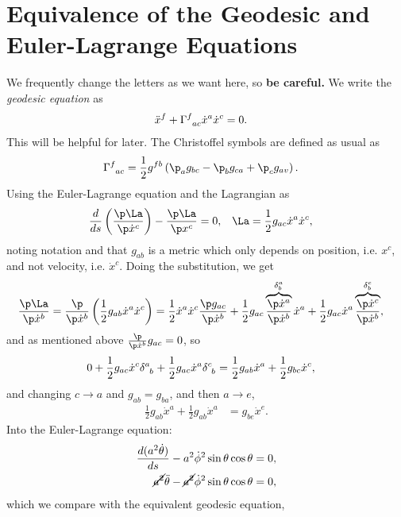 \documentclass[a4paper, 11pt, normalem]{report}
\begin{document}
\section{Equivalence of the Geodesic and Euler-Lagrange Equations}
We frequently change the letters as we want here, so \textbf{be careful.}
We write the \emph{geodesic equation} as
\begin{align}
    \ddot{x}^f + \tensor{\Gamma}{^f_{ac}}\dot{x}^a\dot{x}^c &= 0.
\end{align}
This will be helpful for later. 
The Christoffel symbols are defined as usual as
\begin{align}
    \tensor{\Gamma}{^f_{ac}} &= \frac12g^{fb}\left(\p_ag_{bc}-\p_bg_{ca}+\p_cg_{av}\right). 
\end{align}
Using the Euler-Lagrange equation and the Lagrangian as
\begin{align}
    \frac{d}{ds}\left(\frac{\p\La}{\p\dot{x}^c}\right) - \frac{\p\La}{\p x^c} &= 0, & \La &= \frac12g_{ac}\dot{x}^a\dot{x}^c,
\end{align}
noting notation and that $g_{ab}$ is a metric which only depends on position, i.e. $x^c$, and not velocity, i.e. $\dot{x}^c$.
Doing the substitution, we get
\begin{align}
    \frac{\p\La}{\p\dot{x}^b} &= \frac{\p}{\p\dot{x}^b}\left(\frac12g_{ab}\dot{x}^a\dot{x}^c\right) = \frac12\dot{x}^a\dot{x}^c\frac{\p g_{ac}}{\p\dot{x}^b} + \frac12g_{ac}\overbrace{\frac{\p\dot{x}^a}{\p\dot{x}^b}}^{\delta^a_b}\dot{x}^a + \frac12g_{ac}\dot{x}^a\overbrace{\frac{\p\dot{x}^c}{\p\dot{x}^b}}^{\delta^c_b},
\end{align}
and as mentioned above $\frac{\p}{\p\dot{x}^b}g_{ac}=0$, so
\begin{align}
    0 + \frac12g_{ac}\dot{x}^c\tensor{\delta}{^a_b}+\frac12g_{ac}\dot{x}^a\tensor{\delta}{^c_b} &= \frac12g_{ab}\dot{x}^a+\frac12g_{bc}\dot{x}^c,
\end{align} 
and changing $c\to a$ and $g_{ab}=g_{ba}$, and then $a\to e$, 
\begin{align}
    \frac12g_{ab}\dot{x}^a+\frac12g_{ab}\dot{x}^a &= g_{be}\dot{x}^e.
\end{align}
Into the Euler-Lagrange equation:
\begin{align}
    \frac{d(a^2\dot{\theta})}{ds} - a^2\dot{\phi}^2\sin\theta\cos\theta &= 0, \\
    \cancel{a^2}\ddot{\theta} - \cancel{a^2}\dot{\phi}^2\sin\theta\cos\theta &= 0,
\end{align}
which we compare with the equivalent geodesic equation,
\end{document}
